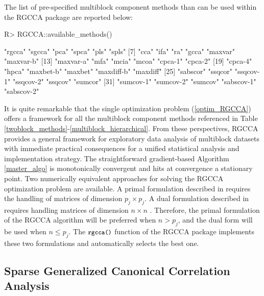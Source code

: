 \documentclass[
]{jss}
\begin{document}
The list of pre-specified multiblock component methods than can be used
within the RGCCA package are reported below:

\footnotesize

\begin{CodeChunk}
\begin{CodeInput}
R> RGCCA::available_methods()
\end{CodeInput}
\begin{CodeOutput}
 [1] "rgcca"     "sgcca"     "pca"       "spca"      "pls"       "spls"     
 [7] "cca"       "ifa"       "ra"        "gcca"      "maxvar"    "maxvar-b" 
[13] "maxvar-a"  "mfa"       "mcia"      "mcoa"      "cpca-1"    "cpca-2"   
[19] "cpca-4"    "hpca"      "maxbet-b"  "maxbet"    "maxdiff-b" "maxdiff"  
[25] "sabscor"   "ssqcor"    "ssqcov-1"  "ssqcov-2"  "ssqcov"    "sumcor"   
[31] "sumcov-1"  "sumcov-2"  "sumcov"    "sabscov-1" "sabscov-2"
\end{CodeOutput}
\end{CodeChunk}

\normalsize

It is quite remarkable that the single optimization problem
(\ref{optim_RGCCA}) offers a framework for all the multiblock component
methods referenced in Table
\ref{twoblock_methods}-\ref{multiblock_hierarchical}. From these
perspectives, RGCCA provides a general framework for exploratory data
analysis of multiblock datasets with immediate practical consequences
for a unified statistical analysis and implementation strategy. The
straightforward gradient-based Algorithm \ref{master_algo} is
monotonically convergent and hits at convergence a stationary point. Two
numerically equivalent approaches for solving the RGCCA optimization
problem are available. A primal formulation described in
\cite{Tenenhaus2011, Tenenhaus2017} requires the handling of matrices of
dimension \(p_j \times p_j\). A dual formulation described in
\cite{Tenenhaus2015} requires handling matrices of dimension
\(n \times n\) . Therefore, the primal formulation of the RGCCA
algorithm will be preferred when \(n>p_j\), and the dual form will be
used when \(n \le p_j\). The \(\small{\texttt{rgcca()}}\) function of
the RGCCA package implements these two formulations and automatically
selects the best one.

\hypertarget{sparse-generalized-canonical-correlation-analysis}{%
\subsection{Sparse Generalized Canonical Correlation
Analysis}\label{sparse-generalized-canonical-correlation-analysis}}
\end{document}

